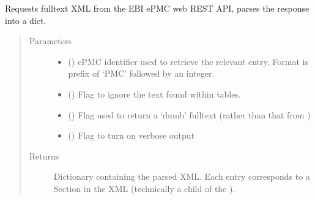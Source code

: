 \documentclass[letterpaper,10pt,english]{sphinxmanual}
\begin{document}
\begin{fulllineitems}
\label{\detokenize{functions:pyresid.get_sections_text}}
Requests fulltext XML from the EBI ePMC web REST API, parses the response into a dict.
\begin{quote}\begin{description}
\item[{Parameters}] \leavevmode\begin{itemize}
\item {} 
 () \textendash{} ePMC identifier used to retrieve the relevant entry. Format is prefix of ‘PMC’
followed by an integer.

\item {} 
 (\sphinxstyleliteralemphasis{\sphinxupquote{, }}\sphinxstyleliteralemphasis{\sphinxupquote{, }}) \textendash{} Flag to ignore the text found within tables.

\item {} 
 (\sphinxstyleliteralemphasis{\sphinxupquote{, }}\sphinxstyleliteralemphasis{\sphinxupquote{, }}) \textendash{} Flag used to return a ‘dumb’ fulltext (rather than that
from {\hyperref[\detokenize{functions:pyresid.reconstruct_fulltext}]{}})

\item {} 
 (\sphinxstyleliteralemphasis{\sphinxupquote{, }}\sphinxstyleliteralemphasis{\sphinxupquote{, }}) \textendash{} Flag to turn on verbose output

\end{itemize}

\item[{Returns}] \leavevmode
{} \textendash{} Dictionary containing the parsed XML. Each entry corresponds to a Section
in the XML (technically a child of the ).


\end{description}
\end{quote}
\end{fulllineitems}
\end{document}
